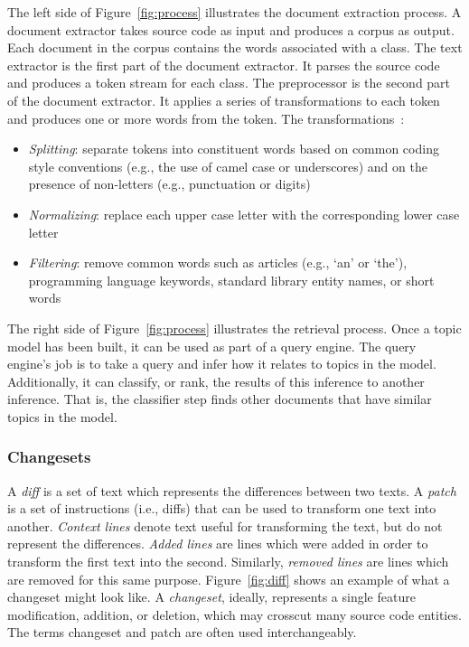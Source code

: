 The left side of Figure~\ref{fig:process} illustrates the document extraction process.
A document extractor takes source code as input and produces a corpus as output.
Each document in the corpus contains the words associated with a class.
The text extractor is the first part of the document extractor.
It parses the source code and produces a token stream for each class.
The preprocessor is the second part of the document extractor.
It applies a series of transformations to each token and
produces one or more words from the token.
The transformations~\cite{Marcus-etal:2004,Marcus-Menzies:2010}: %
\begin{itemize}
    \item {\it Splitting}: separate tokens into constituent words
        based on common coding style conventions (e.g., the use of camel case or underscores)
        and on the presence of non-letters (e.g., punctuation or digits)
    \item {\it Normalizing}: replace each upper case letter with the corresponding
        lower case letter
    \item {\it Filtering}: remove common words such as articles (e.g., `an' or `the'),
        programming language keywords, standard library entity names, or short words
\end{itemize}

The right side of Figure~\ref{fig:process} illustrates the retrieval process.
Once a topic model has been built, it can be used as part of a query engine.
The query engine's job is to take a query and infer how it relates to topics in the model.
Additionally, it can classify, or rank, the results of this inference to another inference.
That is, the classifier step finds other documents that have similar topics in the model.


\subsubsection{Changesets}

A \textit{diff} is a set of text which represents the differences between two texts.
A \textit{patch} is a set of instructions (i.e., diffs) that can be used to transform one text into another.
\textit{Context lines} denote text useful for transforming the text, but do not represent the differences.
\textit{Added lines} are lines which were added in order to transform the first text into the second.
Similarly, \textit{removed lines} are lines which are removed for this same purpose.
Figure~\ref{fig:diff} shows an example of what a changeset might look like.
A \textit{changeset}, ideally, represents a single feature modification, addition, or deletion, which may crosscut many source code entities.
The terms changeset and patch are often used interchangeably.

